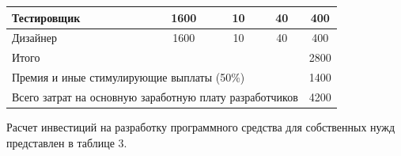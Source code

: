 \begin{table}[ht]
\begin{tabular}{|lccc|c|}
    \multicolumn{1}{|l|}{Тестировщик}                                                     & \multicolumn{1}{c|}{1600}                                                         & \multicolumn{1}{c|}{10}                                                          & 40                                                               & 400       \\ \hline
    \multicolumn{1}{|l|}{Дизайнер}                                                        & \multicolumn{1}{c|}{1600}                                                         & \multicolumn{1}{c|}{10}                                                          & 40                                                               & 400       \\ \hline
    \multicolumn{4}{|l|}{Итого}                                                                                                                                                                                                                                                                                                     & 2800      \\ \hline
    \multicolumn{4}{|l|}{Премия и иные стимулирующие выплаты (50\%)}                                                                                                                                                                                                                                                                & 1400      \\ \hline
    \multicolumn{4}{|l|}{Всего затрат на основную заработную плату разработчиков}                                                                                                                                                                                                                                                   & 4200      \\ \hline
    \end{tabular}
\end{table}

Расчет инвестиций на разработку программного средства для собственных нужд 
представлен в таблице 3.

